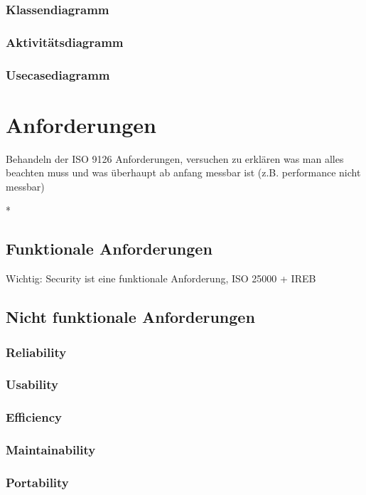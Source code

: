\documentclass[Master,MSE,german]{twbook}
\begin{document}
\subsection{Klassendiagramm}
\subsection{Aktivitätsdiagramm}
\subsection{Usecasediagramm}


\chapter{Anforderungen}
Behandeln der ISO 9126 Anforderungen, versuchen zu erklären was man alles beachten muss und was überhaupt ab anfang messbar ist (z.B. performance nicht messbar)

*

\section{Funktionale Anforderungen}
Wichtig: Security ist eine funktionale Anforderung, ISO 25000 + IREB

\section{Nicht funktionale Anforderungen}
\subsection{Reliability}
\subsection{Usability}
\subsection{Efficiency}
\subsection{Maintainability}
\subsection{Portability}






\end{document}
